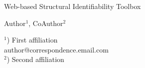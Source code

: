 \documentclass[a4paper]{article}
\begin{document}

\Large
\begin{center}
    Web-based Structural Identifiability Toolbox \\

    \hspace{10pt}

    \large
    Author$^1$, CoAuthor$^2$ \\

    \hspace{10pt}

    \small
    $^1$) First affiliation\\
    author@correspondence.email.com\\
    $^2$) Second affiliation

\end{center}

\hspace{10pt}

\normalsize
\end{document}
